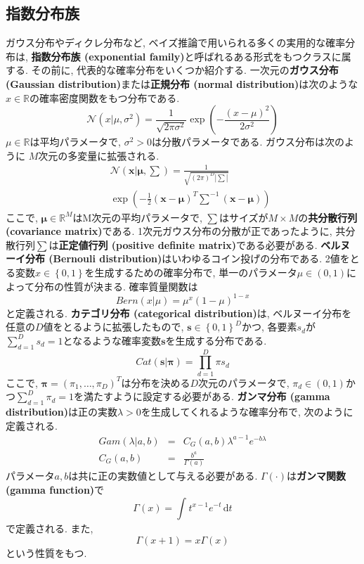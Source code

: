 \documentclass[twocolumn]{jarticle}
\begin{document}
\subsection{指数分布族}
ガウス分布やディクレ分布など, ベイズ推論で用いられる多くの実用的な確率分布は, {\bf 指数分布族 (exponential family)}と呼ばれるある形式をもつクラスに属する. その前に, 代表的な確率分布をいくつか紹介する.
一次元の{\bf ガウス分布 (Gaussian distribution)}または{\bf 正規分布 (normal distribution)}は次のような${x \in \mathbb{R}}$の確率密度関数をもつ分布である.
\begin{equation}
  \mathcal{N} (x|\mu, \sigma^2) = \frac{1}{\sqrt{2\pi \sigma ^2}} \exp (- \frac{(x - \mu)^2}{2\sigma^2})
\end{equation}
${\mu \in \mathbb{R}}$は平均パラメータで, ${\sigma^2 > 0}$は分散パラメータである. ガウス分布は次のように ${M}$次元の多変量に拡張される.
\begin{eqnarray}
  &&\mathcal{N} (\bm {x|\mu, \sum }) = \frac{1}{\sqrt{(2\pi)^D \left\lvert \sum\right\rvert }} \nonumber \\
  && \exp \left(- \frac{1}{2} (\bm {x - \mu})^T {\sum_{}^{}}^{-1} (\bm {x - \mu}) \right)
\end{eqnarray}
ここで, ${\bm {\mu} \in \mathbb{R}^M}$はM次元の平均パラメータで, ${\sum}$はサイズが${M \times M}$の{\bf 共分散行列 (covariance matrix)}である. 1次元ガウス分布の分散が正であったように, 共分散行列${\sum}$は{\bf 正定値行列 (positive definite matrix)}である必要がある.
{\bf ベルヌーイ分布 (Bernouli distribution)}はいわゆるコイン投げの分布である. 2値をとる変数${x \in \left\{0, 1\right\}}$を生成するための確率分布で, 単一のパラメータ${\mu \in (0, 1)}$によって分布の性質が決まる. 確率質量関数は
\begin{equation}
  Bern(x|\mu) = \mu^x(1 - \mu)^{1-x}
\end{equation}
と定義される.
{\bf カテゴリ分布 (categorical distribution)}は, ベルヌーイ分布を任意の${D}$値をとるように拡張したもので, ${\bm {s} \in \left\{0, 1\right\}^D}$かつ, 各要素${s_d}$が${\sum_{d=1}^D s_d = 1}$となるような確率変数${\bm {s}}$を生成する分布である.
\begin{equation}
  Cat (\bm {s} | \bm {\pi}) = \prod_{d=1}^D \pi{s_d}
\end{equation}
ここで, ${\bm {\pi} = (\pi_1, \ldots, \pi_D)^T}$は分布を決める${D}$次元のパラメータで, ${\pi_d \in (0, 1)}$かつ${\sum_{d=1}^D \pi_d = 1}$を満たすように設定する必要がある. {\bf ガンマ分布 (gamma distribution)}は正の実数${\lambda > 0}$を生成してくれるような確率分布で, 次のように定義される.
\begin{eqnarray}
  Gam(\lambda|a, b) &=& C_G(a, b)\lambda^{a-1}e^{-b\lambda} \\
  C_G (a, b) &=& \frac{{b^a}}{\Gamma (a)}
\end{eqnarray}
パラメータ${a, b}$は共に正の実数値として与える必要がある. ${\Gamma(\cdot )}$は{\bf ガンマ関数 (gamma function)}で
\begin{equation}
  \Gamma (x) = \int_{}^{} t^{x-1}e^{-t} \,\mathrm{d}t
\end{equation}
で定義される. また,
\begin{equation}
  \Gamma (x + 1) = x\Gamma(x)
\end{equation}
という性質をもつ.
\end{document}
